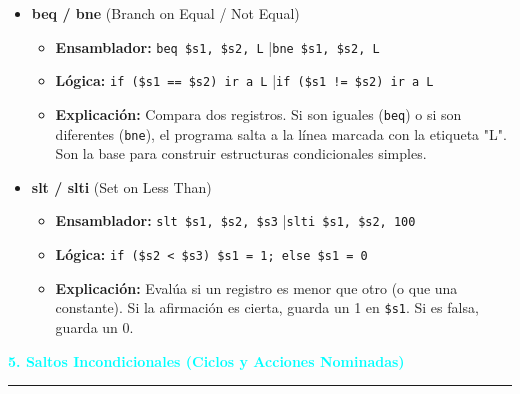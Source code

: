 \documentclass{article}
\begin{document}
\begin{itemize}
    \item \textbf{\large beq / bne} (Branch on Equal / Not Equal)
    \begin{itemize}
        \item \textbf{Ensamblador:} \texttt{beq \$s1, \$s2, L} \quad|\quad \texttt{bne \$s1, \$s2, L}
        \item \textbf{Lógica:} \texttt{if (\$s1 == \$s2) ir a L} \quad|\quad \texttt{if (\$s1 != \$s2) ir a L}
        \item \textbf{Explicación:} Compara dos registros. Si son iguales (\texttt{beq}) o si son diferentes (\texttt{bne}), el programa salta a la línea marcada con la etiqueta "L". Son la base para construir estructuras condicionales simples.
    \end{itemize}
    \vspace{0.2cm}

    \item \textbf{\large slt / slti} (Set on Less Than)
    \begin{itemize}
        \item \textbf{Ensamblador:} \texttt{slt \$s1, \$s2, \$s3} \quad|\quad \texttt{slti \$s1, \$s2, 100}
        \item \textbf{Lógica:} \texttt{if (\$s2 < \$s3) \$s1 = 1; else \$s1 = 0}
        \item \textbf{Explicación:} Evalúa si un registro es menor que otro (o que una constante). Si la afirmación es cierta, guarda un 1 en \texttt{\$s1}. Si es falsa, guarda un 0.
    \end{itemize}
\end{itemize}

\vspace{0.5cm}
\noindent\textcolor{cyan}{\Large\textbf{5. Saltos Incondicionales (Ciclos y Acciones Nominadas)}}
\vspace{0.2cm}\hrule\vspace{0.3cm}
\end{document}
